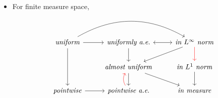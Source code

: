 \documentclass[11pt]{article}
\begin{document}
\begin{itemize}
\item \begin{remark}
For finite measure space, 
\[
  \begin{tikzcd}
     \text{\emph{uniform}} \arrow{dd}{}  \arrow{r}{}  \arrow[rr, swap, bend left] & \text{\emph{uniformly a.e.}}  \arrow{d}{} &\arrow[l, leftrightarrow] \text{\emph{in $L^{\infty}$ norm}} \arrow{dl}{} \arrow[d,  red]  \\
      & \text{\emph{almost uniform}}  \arrow{d}{} \arrow{dr}{} &  \text{\emph{in $L^{1}$ norm}} \arrow{d}{} \\
    \text{\emph{pointwise}}  \arrow{r}{} &   \text{\emph{pointwise a.e}.} \arrow[u, bend left, red] & \text{\emph{in measure}}
  \end{tikzcd}
\] 
\end{remark}
\end{itemize}
\end{document}
